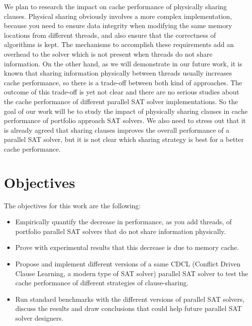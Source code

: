 \documentclass[12pt]{diicc}
\begin{document}
We plan to research the impact on cache performance of physically sharing clauses. Physical sharing obviously involves a more complex implementation, because you need to ensure data integrity when modifying the same memory locations from different threads, and also ensure that the correctness of algorithms is kept. The mechanisms to accomplish these requirements add an overhead to the solver which is not present when threads do not share information. On the other hand, as we will demonstrate in our future work, it is known that sharing information physically between threads usually increases cache performance, so there is a trade-off between both kind of approaches. The outcome of this trade-off is yet not clear and there are no serious studies about the cache performance of different parallel SAT solver implementations. So the goal of our work will be to study the impact of physically sharing clauses in cache performance of portfolio approach SAT solvers. We also need to stress out that it is already agreed that sharing clauses improves the overall performance of a parallel SAT solver\cite{psat}, but it is not clear which sharing strategy is best for a better cache performance.

\chapter{Objectives}\label{chap:objectives}
The objectives for this work are the following:
\begin{itemize}
\item Empirically quantify the decrease in performance, as you add threads, of portfolio parallel SAT solvers that do not share information physically.
\item Prove with experimental results that this decrease is due to memory cache.
\item Propose and implement different versions of a same CDCL (Conflict Driven Clause Learning, a modern type of SAT solver) parallel SAT solver to test the cache performance of different strategies of clause-sharing.
\item Run standard benchmarks with the different versions of parallel SAT solvers, discuss the results and draw conclusions that could help future parallel SAT solver designers.
\end{itemize}
\end{document}
